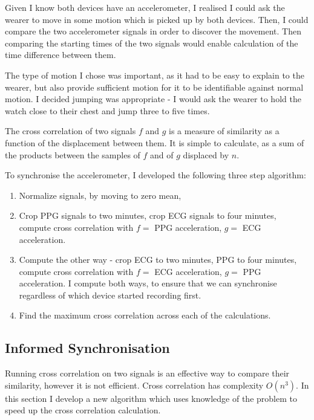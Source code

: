\documentclass[12pt,a4paper,twoside,openright]{report}
\begin{document}
Given I know both devices have an accelerometer, I realised I could ask the
wearer to move in some motion which is picked up by both devices. Then, I
could compare the two accelerometer signals in order to discover the
movement. Then comparing the starting times of the two signals would enable
calculation of the time difference between them.

The type of motion I chose was important, as it had to be easy to explain to
the wearer, but also provide sufficient motion for it to be identifiable
against normal motion. I decided jumping was appropriate -
I would ask the wearer to hold the watch close to their chest and jump three
to five times.

The cross correlation of two signals \(f\) and \(g\) is a measure of
similarity as a function of the displacement between them. It is simple to
calculate, as a sum of the products between the samples of \(f\) and of \(g\)
displaced by \(n\).

To synchronise the accelerometer, I developed the following three step 
algorithm:
\begin{enumerate}
	\item Normalize signals, by moving to zero mean, 

	\item Crop PPG signals to two minutes, crop ECG signals to four
		minutes, compute cross correlation with \(f=\) PPG
		acceleration, \(g=\) ECG acceleration.

	\item Compute the other way - crop ECG to two minutes, PPG to four
		minutes, compute cross correlation with \(f=\) ECG
		acceleration, \(g=\) PPG acceleration. I compute both ways, to
		ensure that we can synchronise regardless of which device
		started recording first.

	\item Find the maximum cross correlation across each of the
		calculations.







\end{enumerate}

\subsection{Informed Synchronisation}

Running cross correlation on two signals is an effective way to compare their
similarity, however it is not efficient. Cross correlation has complexity
\(O(n^3)\). In this section I develop a new algorithm which uses knowledge of
the problem to speed up the cross correlation calculation.
\end{document}
